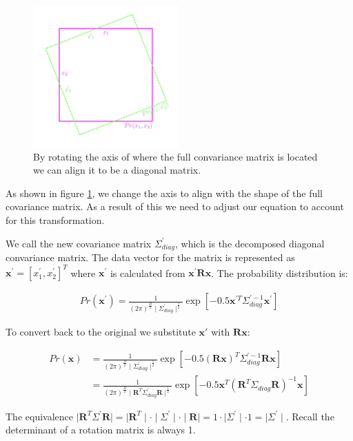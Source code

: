 \documentclass{article}
\begin{document}
\begin{figure}[htpb]
	\centering
	\includegraphics[width=0.5\textwidth]{imgs/full-decomp.png}
	\caption{By rotating the axis of where the full convariance matrix is located we can align it to be a diagonal matrix. \cite{princeCVMLI2012}}
	\label{fig:full-decomp}
\end{figure}

As shown in figure \ref{fig:full-decomp}, we change the axis to align with the shape of the full covariance matrix. As a result of this we need to adjust our equation to account for this transformation.

We call the new covariance matrix $\Sigma^{'}_{diag}$, which is the decomposed diagonal convariance matrix. The data vector for the matrix is represented as $\pmb{x}^{'} = \left[ x_1^{'},x_2^{'} \right]^{T} $ where $\pmb{x^{'}}$ is calculated from $\pmb{x^{'}} \pmb{R}\pmb{x}$. The probability distribution is:

\begin{align*}
	Pr\left( \pmb{x^{'}} \right) = \frac{1}{\left( 2\pi \right)^{\frac{D}{2}}  \mid \Sigma^{'}_{diag}  \mid^{\frac{1}{2}} } \exp \left[ -0.5\pmb{x}^{'T} \Sigma_{diag}^{'-1} \pmb{x^{'}} \right]
\end{align*}

To convert back to the original we substitute $\pmb{x'}$ with $\pmb{Rx}$:

\begin{align*}
	Pr\left( \pmb{x} \right) &= \frac{1}{\left( 2\pi \right)^{\frac{D}{2}} \mid \Sigma_{diag}^{'} \mid^{\frac{1}{2}} } \exp{\left[ -0.5 (\pmb{Rx})^{T} \Sigma_{diag}^{'-1} \pmb{Rx} \right]  } \\
							 &= \frac{1}{\left( 2\pi \right)^{\frac{D}{2}} \mid \pmb{R}^{T} \Sigma_{diag}^{'} \pmb{R} \mid^{\frac{1}{2}} } \exp{\left[ -0.5 \pmb{x}^{T} (\pmb{R}^{T} \Sigma_{diag} \pmb{R})^{-1} \pmb{x} \right]  }
\end{align*}

The equivalence $\mid \pmb{R}^{T} \Sigma^{'} \pmb{R} \mid = \mid \pmb{R}^{T}  \mid \cdot \mid \Sigma^{'}  \mid \cdot \mid \pmb{R} \mid = 1 \cdot \mid \Sigma^{'} \mid \cdot 1 = \mid \Sigma^{'} \mid$. Recall the determinant of a rotation matrix is always 1.





\end{document}
